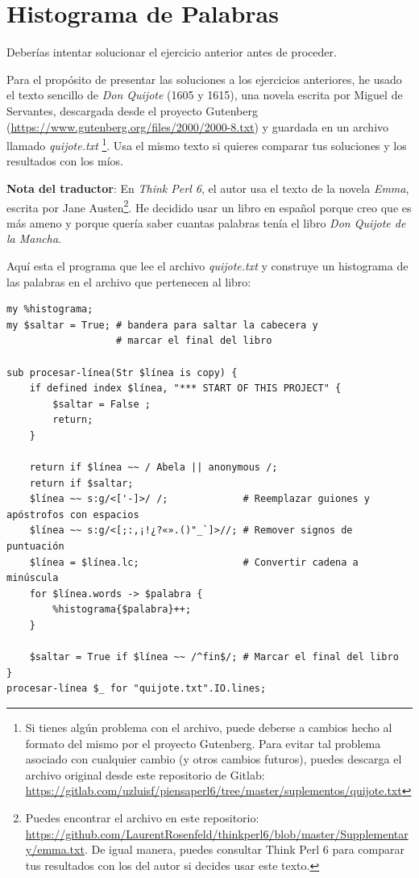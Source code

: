 \section{Histograma de Palabras}

Deberías intentar solucionar el ejercicio anterior antes
de proceder.

Para el propósito de presentar las soluciones a los ejercicios anteriores,
he usado el texto sencillo de {\em Don Quijote} (1605 y 1615), una novela escrita
por Miguel de Servantes, descargada desde el proyecto Gutenberg
(\url{https://www.gutenberg.org/files/2000/2000-8.txt}) y guardada en
un archivo llamado \emph{quijote.txt}
\footnote{Si tienes algún problema
con el archivo, puede deberse a cambios hecho al formato del mismo por
el proyecto Gutenberg. Para evitar tal problema asociado con cualquier
cambio (y otros cambios futuros), puedes descarga el archivo original
desde este repositorio de Gitlab: \url{https://gitlab.com/uzluisf/piensaperl6/tree/master/suplementos/quijote.txt}}.
Usa el mismo texto si quieres comparar tus soluciones y los resultados con los míos.


\begin{description}
\item {\bf Nota del traductor}:	En {\em Think Perl 6}, el autor usa el texto de la novela
\emph{Emma}, escrita por Jane Austen\footnote{Puedes encontrar el archivo en este repositorio: 
\url{https://github.com/LaurentRosenfeld/thinkperl6/blob/master/Supplementary/emma.txt}.
De igual manera, puedes consultar Think Perl 6 para comparar tus resultados con los del 
autor si decides usar este texto.}. He decidido usar un libro en español porque creo que es más ameno y porque quería saber cuantas palabras tenía el libro \emph{Don Quijote de la Mancha}.
\end{description}

Aquí esta el programa que lee el archivo \emph{quijote.txt} y construye un
histograma de las palabras  en el archivo que pertenecen al libro:

\begin{verbatim}
my %histograma;
my $saltar = True; # bandera para saltar la cabecera y 
                   # marcar el final del libro

sub procesar-línea(Str $línea is copy) {
	if defined index $línea, "*** START OF THIS PROJECT" {
		$saltar = False ;
		return;
	}

	return if $línea ~~ / Abela || anonymous /; 
	return if $saltar;
	$línea ~~ s:g/<['-]>/ /;             # Reemplazar guiones y apóstrofos con espacios
	$línea ~~ s:g/<[;:,¡!¿?«».()"_`]>//; # Remover signos de puntuación
	$línea = $línea.lc;                  # Convertir cadena a minúscula
	for $línea.words -> $palabra {
		%histograma{$palabra}++;
	}

	$saltar = True if $línea ~~ /^fin$/; # Marcar el final del libro
}
procesar-línea $_ for "quijote.txt".IO.lines; 
\end{verbatim}

